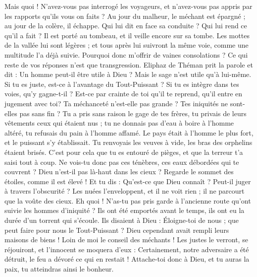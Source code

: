 \begin{multicols}{2}
Mais quoi ! N'avez-vous pas interrogé les voyageurs, et n'avez-vous pas appris par les rapports qu'ils vous on faits ?
Au jour du malheur, le méchant est épargné ; au jour de la colère, il échappe.
Qui lui dit en face sa conduite ? Qui lui rend ce qu'il a fait ?
Il est porté au tombeau, et il veille encore sur sa tombe.
Les mottes de la vallée lui sont légères ; et tous après lui suivront la même voie, comme une multitude l'a déjà suivie.
Pourquoi donc m'offrir de vaines consolations ? Ce qui reste de vos réponses n'est que transgression.
\VerseOne{}Eliphaz de Théman prit la parole et dit :
Un homme peut-il être utile à Dieu ? Mais le sage n'est utile qu'à lui-même.
Si tu es juste, est-ce à l'avantage du Tout-Puissant ? Si tu es intègre dans tes voies, qu'y gagne-t-il ?
Est-ce par crainte de toi qu'il te reprend, qu'il entre en jugement avec toi?
Ta méchanceté n'est-elle pas grande ? Tes iniquités ne sont-elles pas sans fin ?
Tu a pris sans raison le gage de tes frères, tu privais de leurs vêtements ceux qui étaient nus ;
tu ne donnais pas d'eau à boire à l'homme altéré, tu refusais du pain à l'homme affamé.
Le pays était à l'homme le plus fort, et le puissant s'y établissait.
Tu renvoyais les veuves à vide, les bras des orphelins étaient brisés.
C'est pour cela que tu es entouré de pièges, et que la terreur t'a saisi tout à coup.
Ne vois-tu donc pas ces ténèbres, ces eaux débordées qui te couvrent ?
Dieu n'est-il pas là-haut dans les cieux ? Regarde le sommet des étoiles, comme il est élevé !
Et tu dis : Qu'est-ce que Dieu connaît ? Peut-il juger à travers l'obscurité ?
Les nuées l'enveloppent, et il ne voit rien ; il ne parcourt que la voûte des cieux.
Eh quoi ! N'as-tu pas pris garde à l'ancienne route qu'ont suivie les hommes d'iniquité ?
Ils ont été emportés avant le temps, ils ont eu la durée d'un torrent qui s'écoule.
Ils disaient à Dieu : Éloigne-toi de nous ; que peut faire pour nous le Tout-Puissant ?
Dieu cependant avait rempli leurs maisons de biens ! Loin de moi le conseil des méchants !
Les justes le verront, se réjouiront, et l'innocent se moquera d'eux :
Certainement, notre adversaire a été détruit, le feu a dévoré ce qui en restait !
Attache-toi donc à Dieu, et tu auras la paix, tu atteindras ainsi le bonheur.

\end{multicols}
